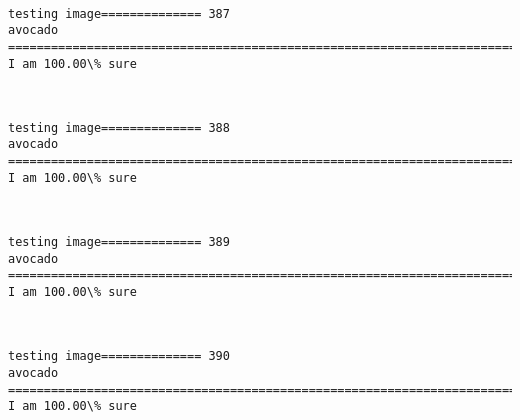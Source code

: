 \documentclass[11pt]{article}
\begin{document}
    \begin{center}
    \end{center}
    { \hspace*{\fill} \\}
    
    \begin{Verbatim}[commandchars=\\\{\}]
testing image============== 387
avocado
============================================================================
I am 100.00\% sure

    \end{Verbatim}

    \begin{center}
    \end{center}
    { \hspace*{\fill} \\}
    
    \begin{Verbatim}[commandchars=\\\{\}]
testing image============== 388
avocado
============================================================================
I am 100.00\% sure

    \end{Verbatim}

    \begin{center}
    \end{center}
    { \hspace*{\fill} \\}
    
    \begin{Verbatim}[commandchars=\\\{\}]
testing image============== 389
avocado
============================================================================
I am 100.00\% sure

    \end{Verbatim}

    \begin{center}
    \end{center}
    { \hspace*{\fill} \\}
    
    \begin{Verbatim}[commandchars=\\\{\}]
testing image============== 390
avocado
============================================================================
I am 100.00\% sure

    \end{Verbatim}
\end{document}
